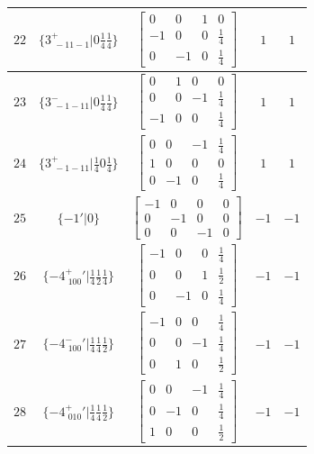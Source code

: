 \documentclass[fleqn,8pt]{jsarticle}
\begin{document}
\begin{longtable}{ccccc}
$ 22 $ & $ \{3^{+}_{\,\,-11-1}|0 \frac{1}{4} \frac{1}{4}\} $ & $ \begin{bmatrix} 0 & 0 & 1 & 0 \\ -1 & 0 & 0 & \frac{1}{4} \\ 0 & -1 & 0 & \frac{1}{4} \end{bmatrix} $ & $ 1 $ & $ 1 $ \\ \hline
$ 23 $ & $ \{3^{-}_{\,\,-1-11}|0 \frac{1}{4} \frac{1}{4}\} $ & $ \begin{bmatrix} 0 & 1 & 0 & 0 \\ 0 & 0 & -1 & \frac{1}{4} \\ -1 & 0 & 0 & \frac{1}{4} \end{bmatrix} $ & $ 1 $ & $ 1 $ \\ \hline
$ 24 $ & $ \{3^{+}_{\,\,-1-11}|\frac{1}{4} 0 \frac{1}{4}\} $ & $ \begin{bmatrix} 0 & 0 & -1 & \frac{1}{4} \\ 1 & 0 & 0 & 0 \\ 0 & -1 & 0 & \frac{1}{4} \end{bmatrix} $ & $ 1 $ & $ 1 $ \\ \hline
$ 25 $ & $ \{-1{}'|0\} $ & $ \begin{bmatrix} -1 & 0 & 0 & 0 \\ 0 & -1 & 0 & 0 \\ 0 & 0 & -1 & 0 \end{bmatrix} $ & $ -1 $ & $ -1 $ \\ \hline
$ 26 $ & $ \{-4^{+}_{\,\,100}{}'|\frac{1}{4} \frac{1}{2} \frac{1}{4}\} $ & $ \begin{bmatrix} -1 & 0 & 0 & \frac{1}{4} \\ 0 & 0 & 1 & \frac{1}{2} \\ 0 & -1 & 0 & \frac{1}{4} \end{bmatrix} $ & $ -1 $ & $ -1 $ \\ \hline
$ 27 $ & $ \{-4^{-}_{\,\,100}{}'|\frac{1}{4} \frac{1}{4} \frac{1}{2}\} $ & $ \begin{bmatrix} -1 & 0 & 0 & \frac{1}{4} \\ 0 & 0 & -1 & \frac{1}{4} \\ 0 & 1 & 0 & \frac{1}{2} \end{bmatrix} $ & $ -1 $ & $ -1 $ \\ \hline
$ 28 $ & $ \{-4^{+}_{\,\,010}{}'|\frac{1}{4} \frac{1}{4} \frac{1}{2}\} $ & $ \begin{bmatrix} 0 & 0 & -1 & \frac{1}{4} \\ 0 & -1 & 0 & \frac{1}{4} \\ 1 & 0 & 0 & \frac{1}{2} \end{bmatrix} $ & $ -1 $ & $ -1 $ \\ \hline

\end{longtable}
\end{document}
